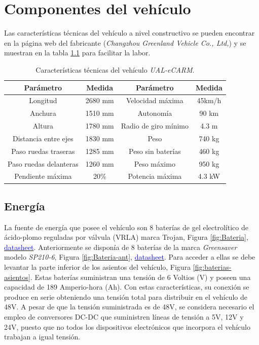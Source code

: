 \chapter{Componentes del vehículo}
Las características técnicas del vehículo a nivel constructivo se pueden encontrar en la página web del fabricante \cite{Greenland} (\textit{Changzhou Greenland Vehicle Co., Ltd,}) y se muestran en la tabla \ref{Tab:medidas_UALeCARM} para facilitar la labor.

\begin{table}[H]
\caption{Características técnicas del vehículo \textit{UAL-eCARM}.}\label{Tab:medidas_UALeCARM}
\centering
\begin{tabular}{|c |c |c |c|}
\hline %
Parámetro & Medida & Parámetro & Medida \\
\hline
Longitud & 2680 mm  &  Velocidad máxima &  45km/h  \\
\hline
Anchura &  1510 mm  & Autonomía & 90 km \\
\hline
Altura & 1780 mm  & Radio de giro mínimo & 4.3 m \\
\hline
Distancia entre ejes &  1830 mm  & Peso & 740 kg \\
\hline
Paso ruedas traseras & 1285 mm  & Peso sin baterías &  460 kg \\
\hline
Paso ruedas delanteras & 1260 mm  &  Peso máximo &  950 kg \\
\hline
Pendiente máxima &  20\% &  Potencia máxima & 4.3 kW \\
\hline
\end{tabular}
\end{table}

\section{Energía}
La fuente de energía que posee el vehículo son 8 baterías de gel electrolítico de ácido-plomo reguladas por válvula (VRLA) marca Trojan, Figura \ref{fig:Bateria}, \href{https://github.com/ual-arm/ual-ecar-docs/blob/master/Datasheet/TROJAN-6VGEL.pdf}{\textcolor{blue}{datasheet}}. Anteriormente se disponía de 8 baterías de la marca \textit{Greensaver} modelo \textit{SP210-6}, Figura \ref{fig:Bateria-ant}, \href{https://github.com/ual-arm/ual-ecar-docs/blob/master/Datasheet/Greensaver_batteries.pdf}{\textcolor{blue}{datasheet}}. Para acceder a ellas se debe levantar la parte inferior de los asientos del vehículo, Figura \ref{fig:baterias-asientos}. Estas baterías suministran una tensión de 6 Voltios (V) y poseen una capacidad de 189 Amperio-hora (Ah). Con estas características, su conexión se produce en serie obteniendo una tensión total para distribuir en el vehículo de 48V. A pesar de que la tensión suministrada es de 48V, se considera necesario el empleo de conversores DC-DC que suministren líneas de tensión a 5V, 12V y 24V, puesto que no todos los dispositivos electrónicos que incorpora el vehículo trabajan a igual tensión.

